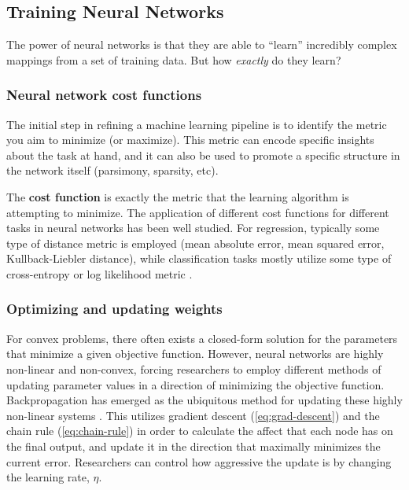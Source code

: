 \subsection{Training Neural Networks}

The power of neural networks is that they are able to ``learn'' incredibly complex mappings from a set of training data.
But how \emph{exactly} do they learn?

\subsubsection{Neural network cost functions}

The initial step in refining a machine learning pipeline is to identify the metric you aim to minimize (or maximize).
This metric can encode specific insights about the task at hand, and it can also be used to promote a specific structure in the network itself (parsimony, sparsity, etc).

The \textbf{cost function} is exactly the metric that the learning algorithm is attempting to minimize.
The application of different cost functions for different tasks in neural networks has been well studied.
For regression, typically some type of distance metric is employed (mean absolute error, mean squared error, Kullback-Liebler distance), while classification tasks mostly utilize some type of cross-entropy or log likelihood metric \cite{paszkePyTorchImperativeStyle2019}.

\subsubsection{Optimizing and updating weights}

For convex problems, there often exists a closed-form solution for the parameters that minimize a given objective function.
However, neural networks are highly non-linear and non-convex, forcing researchers to employ different methods of updating parameter values in a direction of minimizing the objective function.
Backpropagation has emerged as the ubiquitous method for updating these highly non-linear systems \cite{rumelhartLearningRepresentationsBackpropagating1986}.
This utilizes gradient descent (\cref{eq:grad-descent}) and the chain rule (\cref{eq:chain-rule}) in order to calculate the affect that each node has on the final output, and update it in the direction that maximally minimizes the current error.
Researchers can control how aggressive the update is by changing the learning rate, $\eta$.

